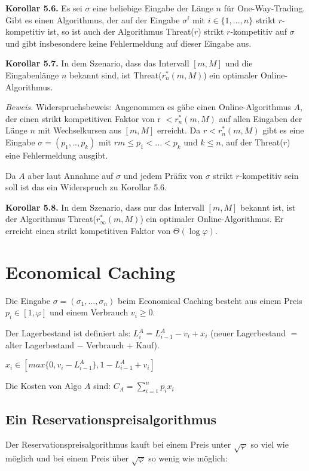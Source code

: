 \textbf{Korollar 5.6.} Es sei $\sigma$ eine beliebige Eingabe der Länge $n$ für One-Way-Trading. Gibt es einen Algorithmus, der auf der Eingabe $\sigma^{i}$ mit $i \in \{1, ..., n\}$ strikt $r$-kompetitiv ist, so ist auch der Algorithmus Threat($r$) strikt $r$-kompetitiv auf $\sigma$ und gibt insbesondere keine Fehlermeldung auf dieser Eingabe aus.

\textbf{Korollar 5.7.} In dem Szenario, dass das Intervall $[m, M]$ und die Eingabenlänge $n$ bekannt sind, ist Threat($r_{n}^{*}(m, M)$) ein optimaler Online-Algorithmus.

\textit{Beweis.} Widerspruchsbeweis: Angenommen es gäbe einen Online-Algorithmus $A$, der einen strikt kompetitiven Faktor von r $< r_{n}^{*}(m, M)$ auf allen Eingaben der Länge $n$ mit Wechselkursen aus $[m, M]$ erreicht. Da $r < r_{n}^{*}(m, M)$ gibt es eine Eingabe $\sigma = (p_{1}, .., p_{k})$ mit $rm \le p_{1} < ... < p_{k}$ und $k \le n$, auf der Threat($r$) eine Fehlermeldung ausgibt.

Da $A$ aber laut Annahme auf $\sigma$ und jedem Präfix von $\sigma$ strikt $r$-kompetitiv sein soll ist das ein Widerspruch zu Korollar 5.6.

\textbf{Korollar 5.8.} In dem Szenario, dass nur das Intervall $[m, M]$ bekannt ist, ist der Algorithmus Threat($r_{\infty}^{*}(m, M)$) ein optimaler Online-Algorithmus. Er erreicht einen strikt kompetitiven Faktor von $\Theta(\log \varphi)$.

\section{Economical Caching}

Die Eingabe $\sigma = (\sigma_{1}, ..., \sigma_{n})$ beim Economical Caching besteht aus einem Preis $p_{i} \in [1, \varphi]$ und einem Verbrauch $v_{i} \ge 0$.

Der Lagerbestand ist definiert als: $L_{i}^{A} = L_{i-1}^{A} - v_{i} + x_{i}$ (neuer Lagerbestand $=$ alter Lagerbestand $-$ Verbrauch $+$ Kauf).

$x_{i} \in [max\{0, v_{i}-L_{i-1}^{A}\}, 1-L_{i-1}^{A}+v_{i}]$

Die Kosten von Algo $A$ sind: $C_{A} = \sum_{i = 1}^{n} p_{i}x_{i}$

\subsection{Ein Reservationspreisalgorithmus}

Der Reservationspreisalgorithmus kauft bei einem Preis unter $\sqrt{\varphi}$ so viel wie möglich und bei einem Preis über $\sqrt{\varphi}$ so wenig wie möglich: \\



